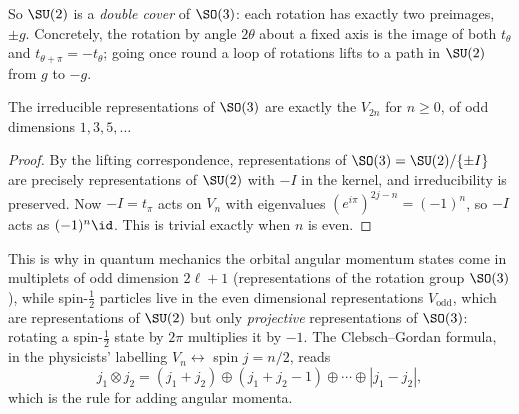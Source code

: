 So $\SU(2)$ is a \emph{double cover} of $\SO(3)$: each rotation has exactly two preimages, $\pm g$. Concretely, the rotation by angle $2\theta$ about a fixed axis is the image of both $t_\theta$ and $t_{\theta+\pi} = -t_\theta$; going once round a loop of rotations lifts to a path in $\SU(2)$ from $g$ to $-g$.

\begin{center}
\end{center}
\vspace{0.3em}

\begin{corollary}
	The irreducible representations of $\SO(3)$ are exactly the $V_{2n}$ for $n\geq0$, of odd dimensions $1, 3, 5,\dots$
\end{corollary}
\begin{proof}
	By the lifting correspondence, representations of $\SO(3) = \SU(2)/\{\pm I\}$ are precisely representations of $\SU(2)$ with $-I$ in the kernel, and irreducibility is preserved. Now $-I = t_\pi$ acts on $V_n$ with eigenvalues $(e^{i\pi})^{2j-n} = (-1)^n$, so $-I$ acts as $(-1)^n\id$. This is trivial exactly when $n$ is even.
\end{proof}

\begin{remark}
	This is why in quantum mechanics the orbital angular momentum states come in multiplets of odd dimension $2\ell+1$ (representations of the rotation group $\SO(3)$), while spin-$\frac12$ particles live in the even dimensional representations $V_{\text{odd}}$, which are representations of $\SU(2)$ but only \emph{projective} representations of $\SO(3)$: rotating a spin-$\frac12$ state by $2\pi$ multiplies it by $-1$. The Clebsch--Gordan formula, in the physicists' labelling $V_n \leftrightarrow$ spin $j = n/2$, reads
	$$j_1\otimes j_2 = (j_1+j_2)\oplus(j_1+j_2-1)\oplus\cdots\oplus|j_1-j_2|,$$
	which is the rule for adding angular momenta.
\end{remark}

